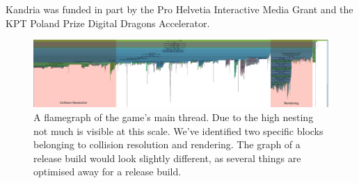 \documentclass[format=sigconf]{acmart}
\begin{document}
Kandria was funded in part by the Pro Helvetia Interactive Media Grant and the KPT Poland Prize Digital Dragons Accelerator.

\begin{figure}
  \begin{centering}
    \includegraphics[width=1.0\textwidth]{flamegraph.png}
  \end{centering}
  \caption{A flamegraph of the game's main thread. Due to the high nesting not much is visible at this scale. We've identified two specific blocks belonging to collision resolution and rendering. The graph of a release build would look slightly different, as several things are optimised away for a release build.}
\end{figure}


\end{document}
